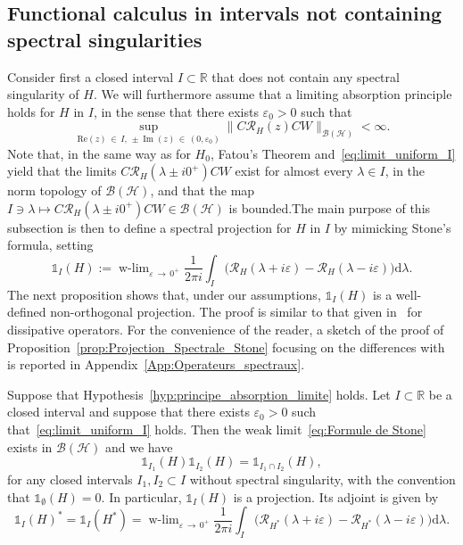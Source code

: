 \documentclass[AHL,Unicode,longabstracts,published]{cedram}
\newcommand{\Hi}{\mathcal{H}}
\newcommand{\R}{\mathbb{R}}
\newcommand{\rmd}{\mathrm{d}}
\newcommand{\Res}{\mathcal{R}}
\newcommand{\clB}{\mathcal{B}}
\DeclareMathOperator{\wlim}{w-lim}
\DeclareMathOperator{\im}{Im}
\newcommand{\Hi}{\mathcal{H}}
\newcommand{\R}{\mathbb{R}}
\DeclareMathOperator{\im}{Im}
\begin{document}
\subsection{Functional calculus in intervals not containing spectral singularities}\label{subsec:spectr_proj}

Consider first a closed interval $I\subset\R$ that does not contain any spectral singularity of $H$. We will furthermore assume that a limiting absorption principle holds for $H$ in $I$, in the sense that there exists $\varepsilon_0>0$ such that
\begin{equation}\label{eq:limit_uniform_I}
\sup_{\mathrm{Re}(z)\,\in\,I,\,\pm\im(z)\,\in\,(0,\varepsilon_0)} \big\|C\Res_H(z)CW\big\|_{\clB(\Hi)}<\infty.
\end{equation}
Note that, in the same way as for $H_0$, Fatou's Theorem and~\eqref{eq:limit_uniform_I} yield that the limits $C\Res_H(\lambda\pm i0^+)CW$ exist for almost every $\lambda\in I$, in the norm topology of $\clB(\Hi)$, and that the map $I \ni\lambda\mapsto C\Res_H(\lambda\pm i0^+)CW\in\clB(\Hi)$ is bounded.The main purpose of this subsection is then to define a spectral projection for $H$ in $I$ by mimicking Stone's formula, setting
\begin{equation}\label{eq:Formule de Stone}
\mathds{1}_I(H):=\wlim_{\varepsilon\,\rightarrow\,0^+}\frac{1}{2\pi i}\int_I\big(\Res_H(\lambda+i\varepsilon)-\Res_H(\lambda-i\varepsilon)\big)\rmd \lambda.
\end{equation}
The next proposition shows that, under our assumptions, $\mathds{1}_I(H)$ is a well-defined non-orthogonal projection. The proof is similar to that given in~\cite{FaFr18_01} for dissipative operators. For the convenience of the reader, a sketch of the proof of Proposition~\ref{prop:Projection_Spectrale_Stone} focusing on the differences with~\cite{FaFr18_01} is reported in Appendix~\ref{App:Operateurs_spectraux}.

\begin{prop}\label{prop:Projection_Spectrale_Stone}
Suppose that Hypothesis~\ref{hyp:principe_absorption_limite} holds. Let $I\subset\R$ be a closed interval and suppose that there exists $\varepsilon_0>0$ such that~\eqref{eq:limit_uniform_I} holds. Then the weak limit~\eqref{eq:Formule de Stone} exists in $\clB(\Hi)$ and we have
\begin{equation}\label{eq:Projection_spectral_propriété_de_projection}
\mathds{1}_{I_1}(H) \mathds{1}_{I_2}(H)=\mathds{1}_{I_1\cap I_2}(H),
\end{equation}
for any closed intervals $I_1,I_2\subset I$ without spectral singularity, with the convention that $\mathds{1}_\emptyset(H)=0$. In particular, $\mathds{1}_I(H)$ is a projection. Its adjoint is given by
\begin{equation}\label{eq:Projection_spectral_propriété_d'adjonction}
\mathds{1}_I(H)^*=\mathds{1}_I(H^*)=\wlim_{\varepsilon\,\rightarrow\, 0^+}\frac{1}{2\pi i}\int_I\big(\Res_{H^*}(\lambda+i\varepsilon)-\Res_{H^*}(\lambda-i\varepsilon)\big)\rmd \lambda.
\end{equation}
\end{prop}
\end{document}
